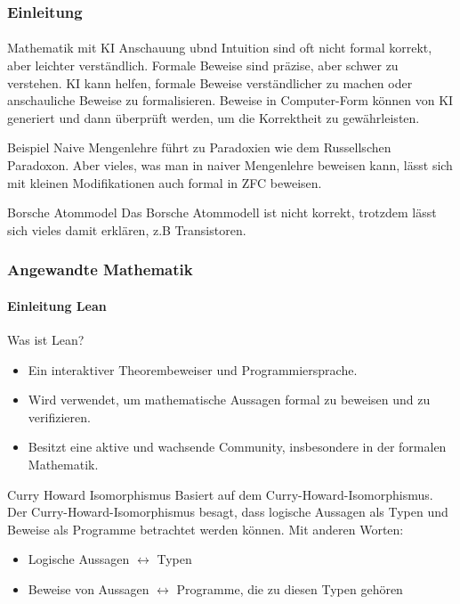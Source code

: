 \documentclass{beamer}
\begin{document}
\begin{frame}
    \frametitle{Einleitung}
\framesubtitle{}

\begin{block}{Mathematik mit KI }
Anschauung  ubnd Intuition sind oft nicht formal korrekt, aber leichter verständlich. 
Formale Beweise sind präzise, aber schwer zu verstehen.
KI kann helfen, formale Beweise verständlicher zu machen oder anschauliche Beweise zu formalisieren.
Beweise in Computer-Form können von KI generiert und dann überprüft werden, um die Korrektheit zu gewährleisten.
\end{block}

\begin{block}{Beispiel}
Naive Mengenlehre führt zu Paradoxien wie dem Russellschen Paradoxon. 
Aber vieles, was man in naiver Mengenlehre beweisen kann, lässt sich mit kleinen Modifikationen auch formal in ZFC beweisen.
\end{block}
 
\begin{block}{Borsche Atommodel}
Das Borsche Atommodell  ist nicht korrekt, 
 trotzdem lässt sich vieles damit erklären, z.B Transistoren.
 \end{block}
\end{frame}


\begin{frame}
    \frametitle{Angewandte Mathematik}
\framesubtitle{Einleitung Lean}
    \begin{block}{Was ist Lean?}
        \begin{itemize}
            \item Ein interaktiver Theorembeweiser und Programmiersprache.
            \item Wird verwendet, um mathematische Aussagen formal zu beweisen und zu verifizieren.
            \item Besitzt eine aktive und wachsende Community, insbesondere in der formalen Mathematik.
        \end{itemize}
    \end{block}

\begin{block}{Curry Howard Isomorphismus}
     Basiert auf dem Curry-Howard-Isomorphismus.
     Der Curry-Howard-Isomorphismus besagt, dass logische Aussagen als Typen und Beweise als Programme betrachtet werden können. Mit anderen Worten:
    \begin{itemize}
        \item Logische Aussagen $\leftrightarrow$ Typen
    
        \item Beweise von Aussagen $\leftrightarrow$  Programme, die zu diesen Typen gehören
    \end{itemize}
    \end{block}
 \end{frame}
\end{document}
